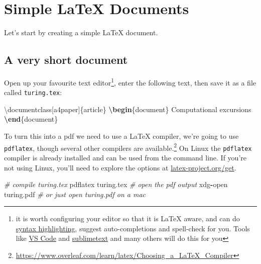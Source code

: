 \documentclass[
]{book}
\newenvironment{Shaded}{\begin{snugshade}}{\end{snugshade}}
\newcommand{\BuiltInTok}[1]{#1}
\newcommand{\CommentTok}[1]{\textcolor[rgb]{0.56,0.35,0.01}{\textit{#1}}}
\newcommand{\ExtensionTok}[1]{#1}
\newcommand{\KeywordTok}[1]{\textcolor[rgb]{0.13,0.29,0.53}{\textbf{#1}}}
\newcommand{\NormalTok}[1]{#1}
\newcommand{\SpecialCharTok}[1]{\textcolor[rgb]{0.81,0.36,0.00}{\textbf{#1}}}
\begin{document}
\chapter{Simple LaTeX Documents}\label{simples}

Let's start by creating a simple LaTeX document.

\section{A very short document}\label{shortest}

Open up your favourite text editor\footnote{it is worth configuring your editor so that it is LaTeX aware, and can do \href{https://en.wikipedia.org/wiki/Syntax_highlighting}{syntax highlighting}, suggest auto-completions and spell-check for you. Tools like \href{https://code.visualstudio.com/}{VS Code} and \href{https://www.sublimetext.com/}{sublimetext} and many others will do this for you}, enter the following text, then save it as a file called \texttt{turing.tex}:

\begin{Shaded}
\begin{Highlighting}[]
\BuiltInTok{\textbackslash{}documentclass}\NormalTok{[a4paper]\{}\ExtensionTok{article}\NormalTok{\}}
\KeywordTok{\textbackslash{}begin}\NormalTok{\{}\ExtensionTok{document}\NormalTok{\}}
\NormalTok{Computational excursions}
\KeywordTok{\textbackslash{}end}\NormalTok{\{}\ExtensionTok{document}\NormalTok{\}}
\end{Highlighting}
\end{Shaded}

To turn this into a pdf we need to use a LaTeX compiler, we're going to use \texttt{pdflatex}, though several other compilers are available.\footnote{\url{https://www.overleaf.com/learn/latex/Choosing_a_LaTeX_Compiler}} On Linux the \texttt{pdflatex} compiler is already installed and can be used from the command line. If you're not using Linux, you'll need to explore the options at \href{https://www.latex-project.org/get/}{latex-project.org/get}.

\begin{Shaded}
\begin{Highlighting}[]
\CommentTok{\# compile turing.tex}
\NormalTok{pdflatex turing.tex}
\CommentTok{\# open the pdf output}
\NormalTok{xdg}\SpecialCharTok{{-}}\NormalTok{open turing.pdf}
\CommentTok{\# or just open turing.pdf on a mac}
\end{Highlighting}
\end{Shaded}
\end{document}
